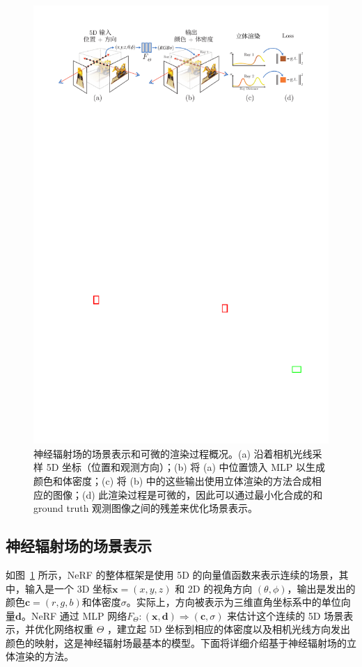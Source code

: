 \begin{figure}[htbp]
    \centering
    \includegraphics[width=0.95\linewidth]{figures/nerf_io.pdf}
    \caption{神经辐射场的场景表示和可微的渲染过程概况\cite{mildenhall2020nerf}。(a) 沿着相机光线采样 5D 坐标（位置和观测方向）；(b) 将 (a) 中位置馈入 MLP 以生成颜色和体密度；(c) 将 (b) 中的这些输出使用立体渲染的方法合成相应的图像；(d) 此渲染过程是可微的，因此可以通过最小化合成的和 ground truth 观测图像之间的残差来优化场景表示。}
    \label{fig:nerf_io}
\end{figure}

\subsection{神经辐射场的场景表示}
如图~\ref{fig:nerf_io} 所示，NeRF 的整体框架是使用 5D 的向量值函数来表示连续的场景，其中，输入是一个 3D 坐标$\displaystyle \symbf{x} = \left(x, y, z \right)$ 和 2D 的视角方向 $\displaystyle \left(\theta, \phi \right)$，输出是发出的颜色$\displaystyle \symbf{c} = \left(r, g, b \right)$和体密度$\displaystyle \sigma$。实际上，方向被表示为三维直角坐标系中的单位向量$\displaystyle \symbf{d}$。NeRF 通过 MLP 网络$\displaystyle F_{\Theta} : \left(\symbf{x}, \symbf{d} \right) \Rightarrow \left(\symbf{c}, \sigma \right)$ 来估计这个连续的 5D 场景表示，并优化网络权重 $\displaystyle \Theta$ ，建立起 5D 坐标到相应的体密度以及相机光线方向发出颜色的映射，这是神经辐射场最基本的模型。下面将详细介绍基于神经辐射场的立体渲染的方法。

